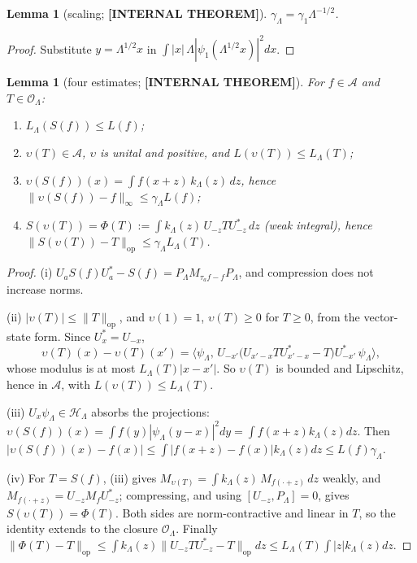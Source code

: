 \documentclass[11pt,a4paper]{article}
\theoremstyle{plain}
\newtheorem{lemma}[theorem]{Lemma}
\theoremstyle{definition}
\newcommand{\Hilb}{\mathcal{H}}
\newcommand{\Op}{\mathcal{O}}
\newcommand{\Acal}{\mathcal{A}}
\newcommand{\opnorm}[1]{\lVert #1 \rVert_{\mathrm{op}}}
\newcommand{\supnorm}[1]{\lVert #1 \rVert_{\infty}}
\begin{document}
\begin{lemma}[scaling; \textbf{[INTERNAL THEOREM]}]\label{lem:scaling}
$\gamma_{\Lambda}=\gamma_{1}\Lambda^{-1/2}$.
\end{lemma}
\begin{proof}
Substitute $y=\Lambda^{1/2}x$ in
$\int|x|\,\Lambda|\psi_{1}(\Lambda^{1/2}x)|^{2}dx$.
\end{proof}

\begin{lemma}[four estimates; \textbf{[INTERNAL THEOREM]}]\label{lem:four_facts}
For $f\in\Acal$ and $T\in\Op_{\Lambda}$:
\begin{enumerate}\setlength{\itemsep}{1pt}
\item[(i)] $L_{\Lambda}(S(f))\le L(f)$;
\item[(ii)] $\upsilon(T)\in\Acal$, $\upsilon$ is unital and positive, and
$L(\upsilon(T))\le L_{\Lambda}(T)$;
\item[(iii)] $\upsilon(S(f))(x)=\int f(x+z)\,k_{\Lambda}(z)\,dz$, hence
$\supnorm{\upsilon(S(f))-f}\le\gamma_{\Lambda}L(f)$;
\item[(iv)] $S(\upsilon(T))=\Phi(T):=\int k_{\Lambda}(z)\,U_{-z}TU_{-z}^{*}\,dz$
(weak integral), hence $\opnorm{S(\upsilon(T))-T}\le\gamma_{\Lambda}
L_{\Lambda}(T)$.
\end{enumerate}
\end{lemma}

\begin{proof}
(i) $U_{a}S(f)U_{a}^{*}-S(f)=P_{\Lambda}M_{\tau_{a}f-f}P_{\Lambda}$, and
compression does not increase norms.

(ii) $|\upsilon(T)|\le\opnorm{T}$, and $\upsilon(1)=1$, $\upsilon(T)\ge0$
for $T\ge0$, from the vector-state form. Since $U_{x}^{*}=U_{-x}$,
\[
\upsilon(T)(x)-\upsilon(T)(x')=\bigl\langle\psi_{\Lambda},\,
U_{-x'}\bigl(U_{x'-x}TU_{x'-x}^{*}-T\bigr)U_{-x'}^{*}\,\psi_{\Lambda}
\bigr\rangle,
\]
whose modulus is at most $L_{\Lambda}(T)|x-x'|$. So $\upsilon(T)$ is
bounded and Lipschitz, hence in $\Acal$, with $L(\upsilon(T))\le
L_{\Lambda}(T)$.

(iii) $U_{x}\psi_{\Lambda}\in\Hilb_{\Lambda}$ absorbs the projections:
$\upsilon(S(f))(x)=\int f(y)|\psi_{\Lambda}(y-x)|^{2}dy=\int f(x+z)
k_{\Lambda}(z)dz$. Then $|\upsilon(S(f))(x)-f(x)|\le\int|f(x+z)-f(x)|
k_{\Lambda}(z)dz\le L(f)\gamma_{\Lambda}$.

(iv) For $T=S(f)$, (iii) gives $M_{\upsilon(T)}=\int k_{\Lambda}(z)\,
M_{f(\cdot+z)}\,dz$ weakly, and $M_{f(\cdot+z)}=U_{-z}M_{f}U_{-z}^{*}$;
compressing, and using $[U_{-z},P_{\Lambda}]=0$, gives
$S(\upsilon(T))=\Phi(T)$. Both sides are norm-contractive and linear in
$T$, so the identity extends to the closure $\Op_{\Lambda}$. Finally
$\opnorm{\Phi(T)-T}\le\int k_{\Lambda}(z)\opnorm{U_{-z}TU_{-z}^{*}-T}dz\le
L_{\Lambda}(T)\int|z|k_{\Lambda}(z)dz$.
\end{proof}
\end{document}
